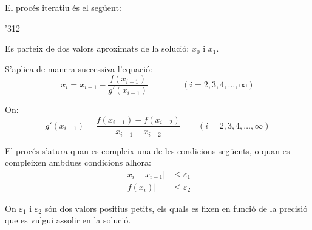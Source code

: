 \begin{center}
    
    \label{pic:metode-secant}
\end{center}


El procés iteratiu és el següent:

\begin{dingautolist}{'312}
    \item Es parteix de dos valors aproximats de la solució: $x_0$ i $x_1$.

    \item   S'aplica de manera successiva l'equació:
            \begin{equation}\label{eq:secant-1}
              x_i = x_{i-1} - \frac{f(x_{i-1})}{g'(x_{i-1})} \qquad\qquad (i=2,3,4,\dots,\infty)
            \end{equation}

            On:
            \begin{equation}\label{eq:secant-2}
              g'(x_{i-1}) = \frac{f(x_{i-1}) - f(x_{i-2}) } {x_{i-1} - x_{i-2}} \qquad (i=2,3,4,\dots,\infty)
            \end{equation}

    \item   El procés s'atura quan es compleix una de les condicions següents, o quan es compleixen ambdues condicions alhora:
            \begin{subequations}\begin{align}
              |x_i - x_{i-1}| &\leq \varepsilon_1 \\
              |f(x_i)| &\leq \varepsilon_2
            \end{align}\end{subequations}

            On $\varepsilon_1$ i $\varepsilon_2$ són dos valors positius petits, els quals es fixen en funció de la precisió que es vulgui assolir en la solució.
\end{dingautolist}


